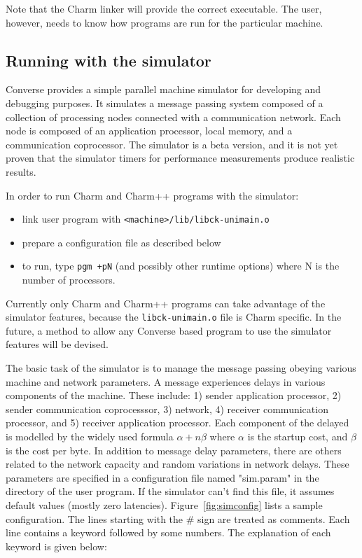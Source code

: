 Note that the Charm linker will provide the correct 
executable. The user, however, needs to know how programs are run for
the particular machine.

\subsection[Running with the simulator]{Running with the simulator}

Converse provides a simple parallel machine simulator for developing
and debugging purposes.  It simulates a message passing system
composed of a collection of processing nodes connected with a
communication network. Each node is composed of an application
processor, local memory, and a communication coprocessor.  The
simulator is a beta version, and it is not yet proven that the
simulator timers for performance measurements produce realistic
results.


In order to run Charm and Charm++ programs with the simulator:
\begin{itemize}

\item link user program with \verb+<machine>/lib/libck-unimain.o+

\item prepare a configuration file as described below

\item to run, type \verb#pgm +pN# (and possibly other runtime options) where
   N is the number of processors.

\end{itemize}
Currently only Charm and Charm++ programs can take advantage of the
simulator features, because the \verb+libck-unimain.o+ file is Charm
specific.  In the future, a method to allow any Converse based program
to use the simulator features will be devised.

The basic task of the simulator is to manage the message passing
obeying various machine and network parameters.  A message experiences
delays in various components of the machine. These include: 1) sender
application processor, 2) sender communication coprocesssor, 3)
network, 4) receiver communication processor, and 5) receiver
application processor.  Each component of the delayed is modelled by
the widely used formula $\alpha + n\beta$ where $\alpha$ is the
startup cost, and $\beta$ is the cost per byte.  In addition to
message delay parameters, there are others related to the network
capacity and random variations in network delays. These parameters are
specified in a configuration file named "sim.param" in the directory
of the user program. If the simulator can't find this file, it assumes
default values (mostly zero latencies).  Figure~\ref{fig:simconfig}
lists a sample configuration. The lines starting with the \# sign are
treated as comments. Each line contains a keyword followed by some
numbers. The explanation of each keyword is given below:

